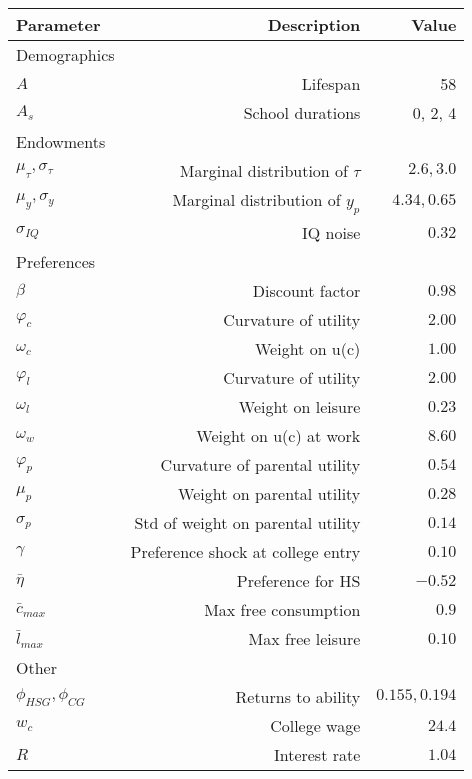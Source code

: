 \begin{tabular}{lrr}
\hline
Parameter & Description  & Value  \\ 
\hline
Demographics &   &   \\ 
$A$ & Lifespan  & 58  \\ 
$A_{s}$ & School durations  & 0, 2, 4  \\ 
Endowments &   &   \\ 
$\mu_{\tau}, \sigma_{\tau}$ & Marginal distribution of $\tau$  & $2.6, 3.0$  \\ 
$\mu_{y}, \sigma_{y}$ & Marginal distribution of $y_{p}$  & $4.34, 0.65$  \\ 
$\sigma_{IQ}$ & IQ noise  & $0.32$  \\ 
Preferences &   &   \\ 
$\beta$ & Discount factor  & $0.98$  \\ 
$\varphi_{c}$ & Curvature of utility  & $2.00$  \\ 
$\omega_{c}$ & Weight on u(c)  & $1.00$  \\ 
$\varphi_{l}$ & Curvature of utility  & $2.00$  \\ 
$\omega_{l}$ & Weight on leisure  & $0.23$  \\ 
$\omega_{w}$ & Weight on u(c) at work  & $8.60$  \\ 
$\varphi_{p}$ & Curvature of parental utility  & $0.54$  \\ 
$\mu_{p}$ & Weight on parental utility  & $0.28$  \\ 
$\sigma_{p}$ & Std of weight on parental utility  & $0.14$  \\ 
$\gamma$ & Preference shock at college entry  & $0.10$  \\ 
$\bar{\eta}$ & Preference for HS  & $-0.52$  \\ 
$\bar{c}_{max}$ & Max free consumption  & $0.9$  \\ 
$\bar{l}_{max}$ & Max free leisure  & $0.10$  \\ 
Other &   &   \\ 
$\phi_{HSG}, \phi_{CG}$ & Returns to ability  & $0.155, 0.194$  \\ 
$w_{c}$ & College wage  & $24.4$  \\ 
$R$ & Interest rate  & $1.04$  \\ 
\hline
\end{tabular}%
